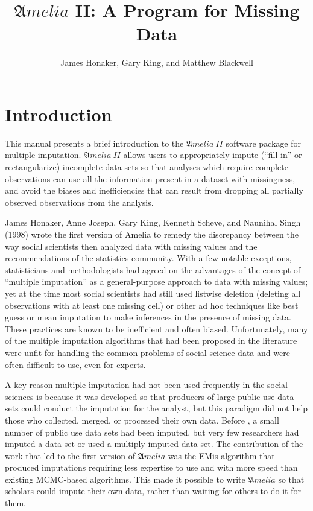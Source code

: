 \documentclass[12pt,titlepage]{article}
\title{${\mathfrak Amelia}$ II: A Program for Missing Data}
\author{James Honaker, Gary King, and Matthew Blackwell}
\newcommand{\Amelia}{\ensuremath{\mathfrak Amelia} }
\newcommand{\AmeliaII}{\ensuremath{\mathfrak Amelia~II} }
\begin{document}
\maketitle

\tableofcontents
\newpage



\section{Introduction}
\label{sec:intro}

This manual presents a brief introduction to the \AmeliaII software
package for multiple imputation.  \AmeliaII allows users to
appropriately impute (``fill in'' or rectangularize) incomplete data
sets so that analyses which require complete observations can use all
the information present in a dataset with missingness, and avoid the
biases and inefficiencies that can result from dropping all partially
observed observations from the analysis.

James Honaker, Anne Joseph, Gary King, Kenneth Scheve, and Naunihal
Singh (1998) wrote the first version of Amelia to remedy the
discrepancy between the way social scientists then analyzed data with
missing values and the recommendations of the statistics community.
With a few notable exceptions, statisticians and methodologists had
agreed on the advantages of the concept of ``multiple imputation'' as
a general-purpose approach to data with missing values; yet at the
time most social scientists had still used listwise deletion (deleting
all observations with at least one missing cell) or other ad hoc
techniques like best guess or mean imputation to make inferences in
the presence of missing data.  These practices are known to be
inefficient and often biased.  Unfortunately, many of the multiple
imputation algorithms that had been proposed in the literature were
unfit for handling the common problems of social science data and were
often difficult to use, even for experts.

A key reason multiple imputation had not been used frequently in the
social sciences is because it was developed so that producers of large
public-use data sets could conduct the imputation for the analyst, but
this paradigm did not help those who collected, merged, or processed
their own data.  Before \citet*{KinHonJos01}, a small number of public
use data sets had been imputed, but very few researchers had imputed a
data set or used a multiply imputed data set.  The contribution of the
work that led to the first version of \Amelia was the EMis algorithm
that produced imputations requiring less expertise to use and with
more speed than existing MCMC-based algorithms.  This made it possible
to write \Amelia so that scholars could impute their own data, rather
than waiting for others to do it for them.
\end{document}
